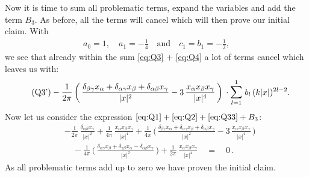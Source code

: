 Now it is time to sum all problematic terms, expand the variables and add the term $B_3$. 
As before, all the terms will cancel which will then prove our initial claim. 
With
\begin{align*}
  a_0 = 1, \quad a_1 = -\frac{1}{4} \quad\text{and}\quad c_1 = b_1 =  -\frac{1}{2},
\end{align*}
we see that already within the sum \eqref{eq:Q3} + \eqref{eq:Q4} a lot of terms cancel which leaves us with:
\begin{align*}
  \label{eq:Q33}
  \tag{Q3'}
  &- \frac{1}{2\pi} \, \bigg(\, \frac{\delta_{\beta\gamma} x_\alpha + \delta_{\alpha \gamma} x_\beta + \delta_{\alpha \beta} x_\gamma}{|x|^2} - 3\, \frac{x_\alpha x_\beta x_\gamma}{|x|^4} \, \bigg) 
  \, \cdot \mathlarger{\sum}_{l = 1}^1 \; b_l \, (k|x|)^{2l - 2}.
\end{align*}
Now let us consider the expression $\eqref{eq:Q1} + \eqref{eq:Q2} + \eqref{eq:Q33} + B_3$:
\begin{align*}
  &-\frac{1}{2\pi} \,  \frac{\delta_{\alpha\beta} x_\gamma}{|x|^2} 
  + \frac{1}{4 \pi }\, \frac{x_\alpha x_\beta x_\gamma}{|x|^4} 
  + \frac{1}{4\pi} \, \bigg(\,\frac{\delta_{\beta\gamma} x_\alpha + \delta_{\alpha \gamma} x_\beta + \delta_{\alpha \beta} x_\gamma}{|x|^2} - 3\, \frac{x_\alpha x_\beta x_\gamma}{|x|^4} \, \bigg) 
   \\[0.5em]
 &\quad - \frac{1}{4 \pi} \, \bigg(\, \frac{\delta_{\alpha\gamma} x_\beta + \delta_{\gamma\beta} x_\alpha  - \delta_{\alpha\beta} x_\gamma}{|x|^2} \, \bigg) 
  + \frac{1}{2\pi}\,  \frac{x_\alpha x_\beta x_\gamma}{|x|^4}
  \quad = \quad 0\, .
\end{align*}
As all problematic terms add up to zero we have proven the initial claim.
